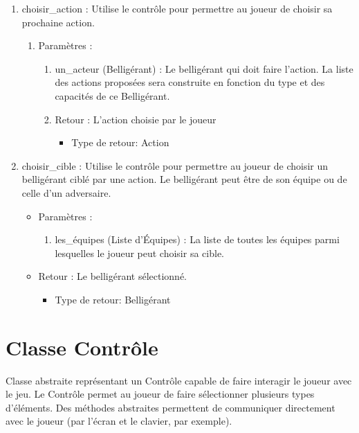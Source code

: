 \documentclass[12pt,pdftex,oneside]{article}
\begin{document}
\begin{itemize}
\begin{enumerate}
    \item choisir\_action : Utilise le contrôle pour permettre au joueur de
      choisir sa prochaine action.
      \begin{enumerate}
      \item Paramètres : 
        \begin{enumerate}
        \item un\_acteur (Belligérant) : Le belligérant qui doit faire
          l'action. La liste des actions proposées sera construite en fonction
          du type et des capacités de ce Belligérant.
      \item Retour : L'action choisie par le joueur
          \begin{itemize}
          \item Type de retour: Action
          \end{itemize}
        \end{enumerate}
    \end{enumerate}

    \item choisir\_cible : Utilise le contrôle pour permettre au joueur de
      choisir un belligérant ciblé par une action. Le belligérant peut être de
      son équipe ou de celle d'un adversaire.
      \begin{itemize}
      \item Paramètres : 
        \begin{enumerate}
        \item les\_équipes (Liste d'Équipes) : La liste de toutes les équipes
          parmi lesquelles le joueur peut choisir sa cible.
        \end{enumerate}
      \item Retour : Le belligérant sélectionné.
          \begin{itemize}
          \item Type de retour: Belligérant
          \end{itemize}
      \end{itemize}

    \end{enumerate}
  \end{itemize}


  \section {Classe Contrôle}

  Classe abstraite représentant un Contrôle capable de faire interagir le joueur
  avec le jeu. Le Contrôle permet au joueur de faire sélectionner 
  plusieurs types d'éléments. Des méthodes abstraites permettent de communiquer
  directement avec le joueur (par l'écran et le clavier, par exemple).
\end{document}

